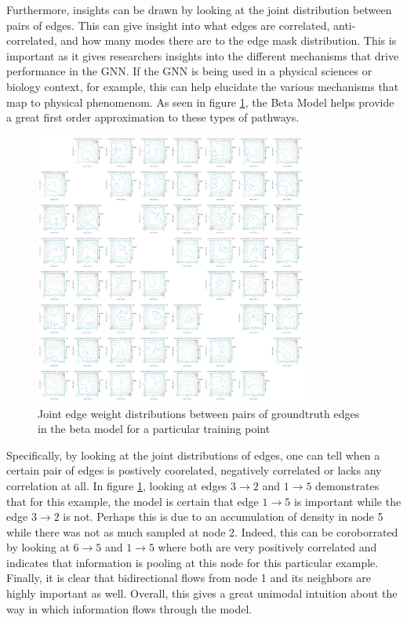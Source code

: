 Furthermore, insights can be drawn by looking at the joint distribution between pairs of edges. This can give insight into what edges are correlated, anti-correlated, and how many modes there are to the edge mask distribution. This is important as it gives researchers insights into the different mechanisms that drive performance in the GNN. If the GNN is being used in a physical sciences or biology context, for example, this can help elucidate the various mechanisms that map to physical phenomenom. As seen in figure \ref{fig:tree-model-beta-joint}, the Beta Model helps provide a great first order approximation to these types of pathways.
\begin{figure}[htb]
	\centering
	\includegraphics[width=0.8\textwidth]{images/tree-model-beta-joint.pdf}
	\caption{Joint edge weight distributions between pairs of groundtruth edges in the beta model for a particular training point}
	\label{fig:tree-model-beta-joint}
\end{figure}

Specifically, by looking at the joint distributions of edges, one can tell when a certain pair of edges is postively coorelated, negatively correlated or lacks any correlation at all. In figure \ref{fig:tree-model-beta-joint}, looking at edges $3 \rightarrow 2$ and $1 \rightarrow 5$ demonstrates that for this example, the model is certain that edge $1 \rightarrow 5$ is important while the edge $3 \rightarrow 2$ is not. Perhaps this is due to an accumulation of density in node 5 while there was not as much sampled at node 2. Indeed, this can be coroborrated by looking at $6 \rightarrow 5$ and $1 \rightarrow 5$ where both are very positively correlated and indicates that information is pooling at this node for this particular example. Finally, it is clear that bidirectional flows from node 1 and its neighbors are highly important as well. Overall, this gives a great unimodal intuition about the way in which information flows through the model.

